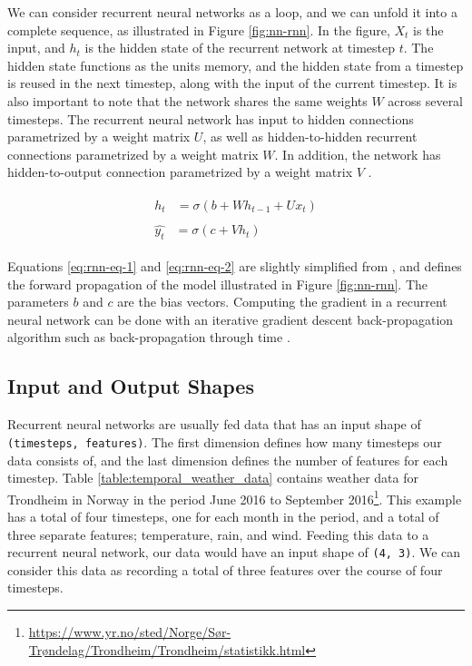 We can consider recurrent neural networks as a loop, and we can unfold it into a complete sequence, as illustrated in Figure \ref{fig:nn-rnn}. In the figure, \(X_{t}\) is the input, and \(h_{t}\) is the hidden state of the recurrent network at timestep \(t\). The hidden state functions as the units memory, and the hidden state from a timestep is reused in the next timestep, along with the input of the current timestep. It is also important to note that the network shares the same weights \(W\) across several timesteps. The recurrent neural network has input to hidden connections parametrized by a weight matrix \(U\), as well as hidden-to-hidden recurrent connections parametrized by a weight matrix \(W\). In addition, the network has hidden-to-output connection parametrized by a weight matrix \(V\) \citep{goodfellow2016deeplearning}.

\begin{align}
    \begin{split}\label{eq:rnn-eq-1}
        h_{t}&=\sigma(b+Wh_{t-1}+Ux_{t})
    \end{split}\\
    \begin{split}\label{eq:rnn-eq-2}
        \hat{y_{t}}&=\sigma(c+Vh_{t})
    \end{split}
\end{align}

Equations \ref{eq:rnn-eq-1} and \ref{eq:rnn-eq-2} are slightly simplified from \cite{goodfellow2016deeplearning}, and defines the forward propagation of the model illustrated in Figure \ref{fig:nn-rnn}. The parameters \(b\) and \(c\) are the bias vectors. Computing the gradient in a recurrent neural network can be done with an iterative gradient descent back-propagation algorithm such as back-propagation through time \citep{werbos1990backpropagation, rumelhart1988learning}. 

\subsection{Input and Output Shapes}
\label{sec:input_and_output_shapes}
Recurrent neural networks are usually fed data that has an input shape of {\tt (timesteps, features)}. The first dimension defines how many timesteps our data consists of, and the last dimension defines the number of features for each timestep. Table \ref{table:temporal_weather_data} contains weather data for Trondheim in Norway in the period June 2016 to September 2016\footnote{\url{https://www.yr.no/sted/Norge/Sør-Trøndelag/Trondheim/Trondheim/statistikk.html}}. This example has a total of four timesteps, one for each month in the period, and a total of three separate features; temperature, rain, and wind. Feeding this data to a recurrent neural network, our data would have an input shape of {\tt (4, 3)}. We can consider this data as recording a total of three features over the course of four timesteps.

